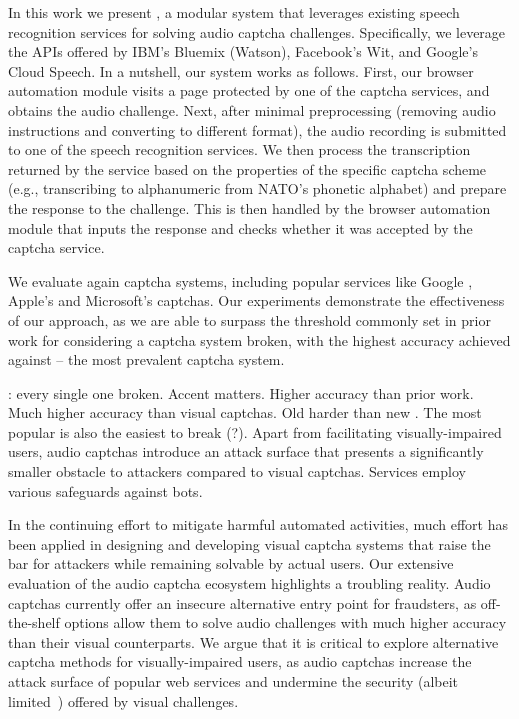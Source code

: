 In this work we present \system, a modular system that leverages existing speech recognition services
for solving audio captcha challenges. Specifically, we leverage the
APIs offered by IBM's Bluemix (Watson), Facebook's Wit, and Google's Cloud Speech. In a nutshell, our system works as
follows. First, our browser automation module visits a page protected by one of the captcha services,
and obtains the audio challenge. Next, after minimal preprocessing (removing audio instructions and 
converting to different format), the audio recording is submitted 
to one of the speech recognition services. We then process the transcription returned by the service
based on the properties of the specific captcha scheme (e.g., transcribing to alphanumeric 
from NATO's phonetic alphabet) and prepare the response to the challenge. This is then handled by
the browser automation module that inputs the response and checks whether it was accepted by the captcha
service.

We evaluate \system again \no captcha systems, including popular services like Google \re,
Apple's and Microsoft's captchas. Our experiments demonstrate the effectiveness of our approach,
as we are able to  surpass the threshold commonly set in prior work for considering
a captcha system broken, with the highest accuracy achieved against \re -- the most prevalent 
captcha system.

: every single one broken. Accent matters. Higher accuracy than prior work. Much higher accuracy than
visual captchas. Old \re harder than new \re. The most popular is also the easiest to break (?).
Apart from facilitating visually-impaired users, audio captchas introduce an attack
surface that presents a significantly smaller obstacle to attackers compared to visual captchas.
Services employ various safeguards against bots.

In the continuing effort to mitigate harmful automated activities, much effort has been applied in 
designing and developing visual captcha systems that raise the bar for attackers while remaining 
solvable by actual users. Our extensive evaluation of the audio captcha ecosystem highlights
a troubling reality. Audio captchas currently offer an insecure alternative entry point for fraudsters,
as off-the-shelf options allow them to solve audio challenges with much higher accuracy than their visual
counterparts. We argue that it is critical to explore alternative captcha methods for visually-impaired users,
as audio captchas increase the attack surface of popular web services and undermine the security
(albeit limited~\cite{185128,sivakorn:eurosp16}) offered by visual challenges.

